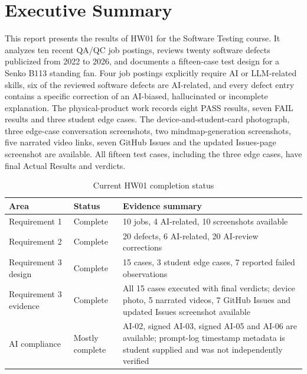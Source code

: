\section{Executive Summary}

This report presents the results of HW01 for the Software Testing course. It analyzes ten recent QA/QC job postings, reviews twenty software defects publicized from 2022 to 2026, and documents a fifteen-case test design for a Senko B113 standing fan. Four job postings explicitly require AI or LLM-related skills, six of the reviewed software defects are AI-related, and every defect entry contains a specific correction of an AI-biased, hallucinated or incomplete explanation. The physical-product work records eight PASS results, seven FAIL results and three student edge cases. The device-and-student-card photograph, three edge-case conversation screenshots, two mindmap-generation screenshots, five narrated video links, seven GitHub Issues and the updated Issues-page screenshot are available. All fifteen test cases, including the three edge cases, have final Actual Results and verdicts.

\begin{table}[H]\centering

\caption{Current HW01 completion status}

\begin{tabular}{p{}p{}p{}}\toprule

Area & Status & Evidence summary \\\midrule

Requirement 1 & Complete & 10 jobs, 4 AI-related, 10 screenshots available \\

Requirement 2 & Complete & 20 defects, 6 AI-related, 20 AI-review corrections \\

Requirement 3 design & Complete & 15 cases, 3 student edge cases, 7 reported failed observations \\

Requirement 3 evidence & Complete & All 15 cases executed with final verdicts; device photo, 5 narrated videos, 7 GitHub Issues and updated Issues screenshot available \\

AI compliance & Mostly complete & AI-02, signed AI-03, signed AI-05 and AI-06 are available; prompt-log timestamp metadata is student supplied and was not independently verified \\\bottomrule

\end{tabular}\end{table}

